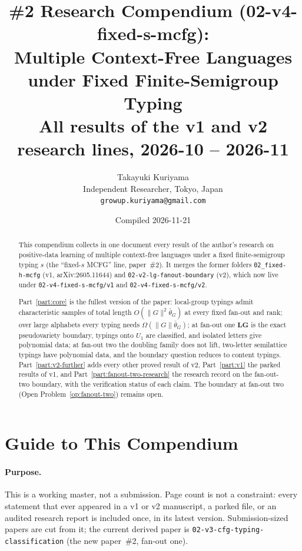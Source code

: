 \documentclass[11pt]{article}
\title{\#2 Research Compendium (02-v4-fixed-s-mcfg):\\
Multiple Context-Free Languages under Fixed Finite-Semigroup Typing\\[0.4ex]
\large All results of the v1 and v2 research lines, 2026-10 -- 2026-11}
\author{Takayuki Kuriyama\\
Independent Researcher, Tokyo, Japan\\
\texttt{growup.kuriyama@gmail.com}}
\date{Compiled 2026-11-21}
\numberwithin{equation}{section}
\theoremstyle{plain}
\theoremstyle{definition}
\theoremstyle{remark}
\theoremstyle{plain}
\begin{document}
\maketitle

\begin{abstract}
This compendium collects in one document every result of the author's research on
positive-data learning of multiple context-free languages under a fixed finite-semigroup
typing $s$ (the ``fixed-$s$ MCFG'' line, paper~\#2).  It merges the former folders
\texttt{02\_fixed-h-mcfg} (v1, arXiv:2605.11644) and
\texttt{02-v2-lg-fanout-boundary} (v2), which now live under \texttt{02-v4-fixed-s-mcfg/v1}
and \texttt{02-v4-fixed-s-mcfg/v2}.

Part~\ref{part:core} is the fullest version of the paper: local-group typings admit
characteristic samples of total length $O(\|G\|^2\bar\theta_G)$ at every fixed fan-out and
rank; over large alphabets every typing needs $\Omega(\|G\|\bar\theta_G)$; at fan-out one
$\mathbf{LG}$ is the exact pseudovariety boundary, typings onto $U_1$ are classified, and
isolated letters give polynomial data; at fan-out two the doubling family does not lift,
two-letter semilattice typings have polynomial data, and the boundary question reduces to
content typings.  Part~\ref{part:v2-further} adds every other proved result of v2,
Part~\ref{part:v1} the parked results of v1, and Part~\ref{part:fanout-two-research} the
research record on the fan-out-two boundary, with the verification status of each claim.
The boundary at fan-out two (Open Problem~\ref{op:fanout-two}) remains open.
\end{abstract}

\section*{Guide to This Compendium}

\paragraph{Purpose.}
This is a working master, not a submission.  Page count is not a constraint: every
statement that ever appeared in a v1 or v2 manuscript, a parked file, or an audited research
report is included once, in its latest version.  Submission-sized papers are cut from it;
the current derived paper is \texttt{02-v3-cfg-typing-classification} (the new paper~\#2,
fan-out one).
\end{document}
